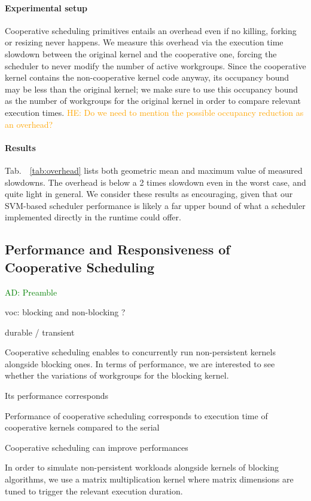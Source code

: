 \documentclass[numbers,nocopyrightspace,10pt]{sigplanconf}
\newcommand{\ADComment}[1]{\textcolor{green}{AD: #1}}
\newcommand{\HEComment}[1]{\textcolor{orange}{HE: #1}}
\newcommand{\mytab}{Tab.~}
\begin{document}
\paragraph{Experimental setup}
Cooperative scheduling primitives entails an overhead even if no
killing, forking or resizing never happens. We measure this overhead
via the execution time slowdown between the original kernel and the
cooperative one, forcing the scheduler to never modify the number of
active workgroups. Since the cooperative kernel contains the
non-cooperative kernel code anyway, its occupancy bound may be less
than the original kernel; we make sure to use this occupancy bound as
the number of workgroups for the original kernel in order to compare
relevant execution times. \HEComment{Do we need to mention the
  possible occupancy reduction as an overhead?}

\paragraph{Results}
\mytab~\ref{tab:overhead} lists both geometric mean and maximum value
of measured slowdowns. The overhead is below a 2 times slowdown even
in the worst case, and quite light in general. We consider these
results as encouraging, given that our SVM-based scheduler performance
is likely a far upper bound of what a scheduler implemented directly
in the runtime could offer.

\subsection{Performance and Responsiveness of Cooperative Scheduling}\label{sec:responsiveness}

\ADComment{Preamble}

voc: blocking and non-blocking ?

durable / transient

Cooperative scheduling enables to concurrently run non-persistent kernels alongside blocking ones. In terms of performance, we are interested to see whether the variations of workgroups for the blocking kernel.

Its performance corresponds

Performance of cooperative scheduling corresponds to execution time of cooperative kernels compared to the serial 

Cooperative scheduling can improve performances 

In order to simulate non-persistent workloads alongside kernels of
blocking algorithms, we use a matrix multiplication kernel where
matrix dimensions are tuned to trigger the relevant execution
duration.
\end{document}
